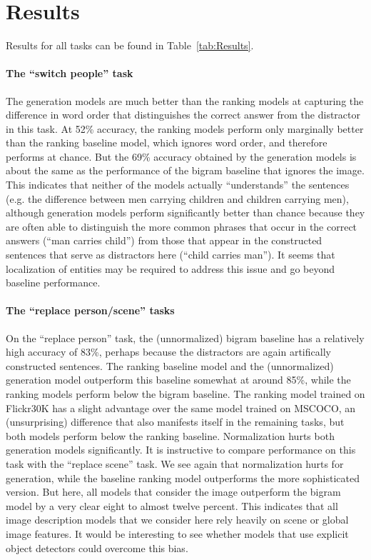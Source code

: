 \documentclass[11pt]{article}
\begin{document}
\section{Results}
\label{sec:results}

Results for all tasks can be found in Table~\ref{tab:Results}.

\paragraph{The ``switch people'' task}
The generation models are much better than the ranking models at capturing the difference in word order that distinguishes the correct answer from the distractor in this task. 
At 52\% accuracy, the ranking models perform only marginally better than the ranking baseline model, which ignores word order, and therefore performs at chance.
But the 69\% accuracy obtained by the  generation models  is about the same as the performance of the bigram baseline that ignores the image. This indicates that neither of the models actually ``understands''  the sentences (e.g. the difference between men carrying children and children carrying men), although generation models perform significantly better than chance because they are often able to distinguish the more common phrases that occur in the correct answers (``man carries  child'') from those that appear in the constructed sentences that serve as distractors here (``child carries man'').  It seems that localization of entities \cite{Plummer_2015_ICCV,DBLP:journals/corr/XuBKCCSZB15} may be required to address this issue and go beyond baseline performance.

\paragraph{The ``replace person/scene'' tasks}
On the ``replace person'' task, the  (unnormalized) bigram baseline has a relatively high accuracy of 83\%, perhaps because the distractors are again artifically constructed sentences. The ranking baseline model and the (unnormalized) generation model outperform this baseline somewhat at around 85\%, while the ranking models perform below the bigram baseline. The ranking model trained on Flickr30K has a slight advantage over the same  model trained on MSCOCO, an (unsurprising) difference that also manifests itself in the remaining tasks, but both models perform below the ranking baseline. Normalization hurts both generation models significantly. 
It is instructive to compare performance on this task with the ``replace scene'' task. We see again that normalization hurts for generation, while the baseline ranking model outperforms the more sophisticated version. But here,  all models that consider the image outperform the bigram model by a very clear eight to almost twelve percent. This indicates that all image description models that we consider here rely heavily on scene or global image features. It would be interesting to see whether models that use explicit object detectors could overcome this bias. 
\end{document}
